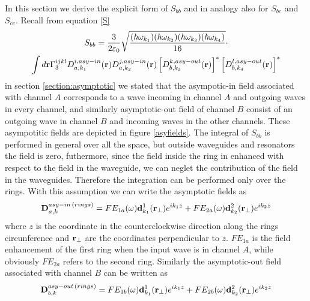 In this section we derive the explicit form of $S_{bb}$ and in analogy also for $S_{bc}$ and $S_{cc}$. Recall from equation \eqref{S}
\begin{multline}\label{sbb} S_{bb} =\frac{3}{2\varepsilon_0}\sqrt{\frac{(\hbar\omega_{k_1})(\hbar\omega_{k_2})(\hbar\omega_{k_3})(\hbar\omega_{k_4})}{16}}\cdot \\ \int d\mathbf{r} \Gamma^{ijkl}_3D^{i,asy-in}_{a,k_1}(\mathbf{r})D^{j,asy-in}_{a,k_2}(\mathbf{r})\left[D^{k,asy-out}_{b,k_3}(\mathbf{r})\right]^*\left[D^{l,asy-out}_{b,k_4}(\mathbf{r})\right]^*\end{multline}
in section \ref{section:asymptotic} we stated that the asympotic-in field associated with channel $A$ corresponds to a wave incoming in channel $A$ and outgoing waves in every channel, and similarly asymptotic-out field of channel $B$ consist of an outgoing wave in channel $B$ and incoming waves in the other channels. These asympotitic fields are depicted in figure \ref{asyfields}. The integral of $S_{bb}$ is performed in general over all the space, but outside waveguides and resonators the field is zero, futhermore, since the field inside the ring in enhanced with respect to the field in the waveguide, we can neglet the contribution of the field in the waveguides. Therefore the integration can be performed only over the rings. With this assumption we can write the asymptotic fields as
\begin{equation}\mathbf{D}^{asy-in\,(rings)}_{a,k} = FE_{1a}(\omega) \mathbf{d}^1_{k_1}(\mathbf{r}_\perp)e^{ik_1z} + FE_{2a}(\omega) \mathbf{d}_{k_2}^2(\mathbf{r}_\perp)e^{ik_2z} \end{equation}
where $z$ is the coordinate in the counterclockwise direction along the rings circunference and $\mathbf{r}_\perp$ are the coordinates perpendicular to $z$. $FE_{1a}$ is the field enhancement of the first ring when the input wave is in channel $A$, while obviously $FE_{2a}$ refers to the second ring. Similarly the asymptotic-out field associated with channel $B$ can be written as
\begin{equation}\mathbf{D}^{asy-out\,(rings)}_{b,k} = FE_{1b}(\omega) \mathbf{d}^1_{k_1}(\mathbf{r}_\perp)e^{ik_1z} + FE_{2b}(\omega)\mathbf{d}_{k_2}^2(\mathbf{r}_\perp)e^{ik_2z} \end{equation}
